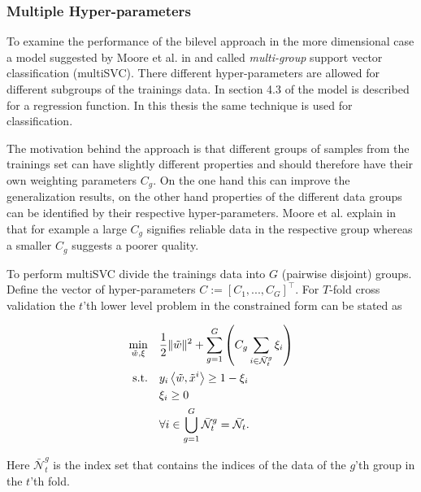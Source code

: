 \subsubsection{Multiple Hyper-parameters}

To examine the performance of the bilevel approach in the more dimensional case a model suggested by Moore et al. in \cite{Moore2011} and called \emph{multi-group} support vector classification (multiSVC). There different hyper-parameters are allowed for different subgroups of the trainings data.
In section 4.3 of \cite{Moore2011} the model is described for a regression function. In this thesis the same technique is used for classification.

The motivation behind the approach is that different groups of samples from the trainings set can have slightly different properties and should therefore have their own weighting parameters \(C_g\).
On the one hand this can improve the generalization results, on the other hand properties of the different data groups can be identified by their respective hyper-parameters. Moore et al. explain in \cite[section 4.3, p. 9]{Moore2011} that for example a large \(C_g\) signifies reliable data in the respective group whereas a smaller \(C_g\) suggests a poorer quality.

To perform multiSVC divide the trainings data into \(G\) (pairwise disjoint) groups.
Define the vector of hyper-parameters \(C := [C_1,...,C_G]^{\top}\).
For \(T\)-fold cross validation the \(t\)'th lower level problem in the constrained form can be stated as 

\begin{align*}
\begin{split}
	\min_{\tilde{w},\xi} \quad & \frac{1}{2} \|\tilde{w}\|^2+\sum_{g = 1}^G\left(C_g\sum_{i \in \bar{\mathcal{N}}_t^g}{\xi_i}\right) \vspace{0.5ex}\\
	\text{s.t.} \quad & y_i\Langle \tilde{w},\tilde{x}^i\Rangle \geq 1 - \xi_i \vspace{0.5ex}\\
	& \xi_i \geq 0 \\
	& 	\forall i \in \bigcup_{g =1}^G \bar{\mathcal{N}}_t^g = \bar{\mathcal{N}}_t.
\end{split}
\end{align*}

Here \(\bar{\mathcal{N}}_t^g\) is the index set that contains the indices of the data of the \(g\)'th group in the \(t\)'th fold.

